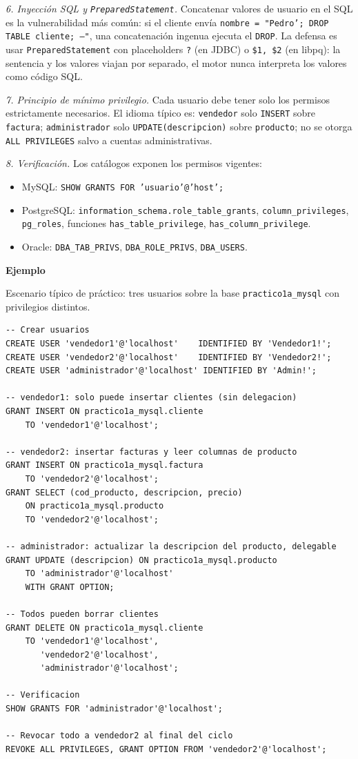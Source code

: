 \documentclass[11pt,a4paper]{article}
\newcommand{\itemcabecera}[1]{\noindent\textbf{#1}\par\medskip}
\newcommand{\bloqueEjemplo}{\itemcabecera{Ejemplo}}
\begin{document}
\textit{6. Inyección SQL y \texttt{PreparedStatement}.} Concatenar valores de usuario en el SQL es la vulnerabilidad más común: si el cliente envía \texttt{nombre = "Pedro'; DROP TABLE cliente; --"}, una concatenación ingenua ejecuta el \texttt{DROP}. La defensa es usar \texttt{PreparedStatement} con placeholders \texttt{?} (en JDBC) o \texttt{\$1, \$2} (en libpq): la sentencia y los valores viajan por separado, el motor nunca interpreta los valores como código SQL.

\textit{7. Principio de mínimo privilegio.} Cada usuario debe tener solo los permisos estrictamente necesarios. El idioma típico es: \texttt{vendedor} solo \texttt{INSERT} sobre \texttt{factura}; \texttt{administrador} solo \texttt{UPDATE(descripcion)} sobre \texttt{producto}; no se otorga \texttt{ALL PRIVILEGES} salvo a cuentas administrativas.

\textit{8. Verificación.} Los catálogos exponen los permisos vigentes:

\begin{itemize}
    \item MySQL: \texttt{SHOW GRANTS FOR 'usuario'@'host';}
    \item PostgreSQL: \texttt{information\_schema.role\_table\_grants}, \texttt{column\_privileges}, \texttt{pg\_roles}, funciones \texttt{has\_table\_privilege}, \texttt{has\_column\_privilege}.
    \item Oracle: \texttt{DBA\_TAB\_PRIVS}, \texttt{DBA\_ROLE\_PRIVS}, \texttt{DBA\_USERS}.
\end{itemize}

\bloqueEjemplo

Escenario típico de práctico: tres usuarios sobre la base \texttt{practico1a\_mysql} con privilegios distintos.

\begin{lstlisting}
-- Crear usuarios
CREATE USER 'vendedor1'@'localhost'    IDENTIFIED BY 'Vendedor1!';
CREATE USER 'vendedor2'@'localhost'    IDENTIFIED BY 'Vendedor2!';
CREATE USER 'administrador'@'localhost' IDENTIFIED BY 'Admin!';

-- vendedor1: solo puede insertar clientes (sin delegacion)
GRANT INSERT ON practico1a_mysql.cliente
    TO 'vendedor1'@'localhost';

-- vendedor2: insertar facturas y leer columnas de producto
GRANT INSERT ON practico1a_mysql.factura
    TO 'vendedor2'@'localhost';
GRANT SELECT (cod_producto, descripcion, precio)
    ON practico1a_mysql.producto
    TO 'vendedor2'@'localhost';

-- administrador: actualizar la descripcion del producto, delegable
GRANT UPDATE (descripcion) ON practico1a_mysql.producto
    TO 'administrador'@'localhost'
    WITH GRANT OPTION;

-- Todos pueden borrar clientes
GRANT DELETE ON practico1a_mysql.cliente
    TO 'vendedor1'@'localhost',
       'vendedor2'@'localhost',
       'administrador'@'localhost';

-- Verificacion
SHOW GRANTS FOR 'administrador'@'localhost';

-- Revocar todo a vendedor2 al final del ciclo
REVOKE ALL PRIVILEGES, GRANT OPTION FROM 'vendedor2'@'localhost';
\end{lstlisting}
\end{document}
